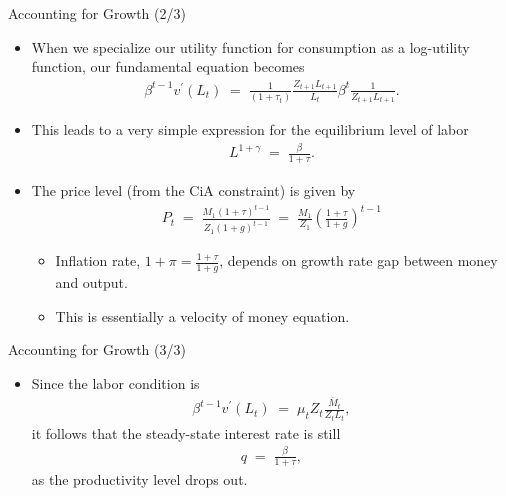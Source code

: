 \documentclass[10pt,c,aspectratio=1610,handout]{beamer}
\begin{document}
\begin{frame}{Accounting for Growth (2/3)}%
  \begin{itemize}%
    \item[$\blacktriangleright$] When we specialize our utility function for consumption as a log-utility function, our fundamental equation becomes%
    \begin{align}%
      \beta^{t-1} v^{\prime} (L_{t}) \; = \; \frac{1}{(1+\tau_{t})} \frac{Z_{t+1} L_{t+1}}{L_{t}} \beta^{t} \frac{1}{Z_{t+1} L_{t+1}}. \label{key 1b}%
    \end{align}%
    \pause%
    \item[$\blacktriangleright$] This leads to a very simple expression for the equilibrium level of labor%
    \begin{align*}%
      L^{1+\gamma} \; = \; \frac{\beta}{1+\tau}.%
    \end{align*}%
    \pause%
    \item[$\blacktriangleright$] The price level (from the CiA constraint) is given by%
    \begin{align*}%
      P_t \; = \; \frac{M_1 (1+\tau)^{t-1}}{Z_1 (1+g)^{t-1}} \; = \; \frac{M_1}{Z_1} \left( \frac{1+\tau}{1+g} \right)^{t-1}%
    \end{align*}%
    \begin{itemize}%
      \item[$\rightarrow$] Inflation rate, $1+\pi = \frac{1+\tau}{1+g}$, depends on growth rate gap between money and output.%
    \item[$\rightarrow$] This is essentially a velocity of money equation.%
    \end{itemize}%
  \end{itemize}%
\end{frame}%
\begin{frame}{Accounting for Growth (3/3)}%
  \begin{itemize}%
    \item[$\blacktriangleright$] Since the labor condition is%
    \begin{align*}%
      \beta^{t-1} v^{\prime} (L_{t}) \; = \; \mu_{t} Z_{t} \frac{\bar{M}_{t}}{Z_{t} L_{t}},%
    \end{align*}%
    it follows that the steady-state interest rate is still%
    \begin{align*}%
      q \; = \; \frac{\beta}{1+\tau},%
    \end{align*}%
    as the productivity level drops out.%
  \end{itemize}%
\end{frame}%
\end{document}
